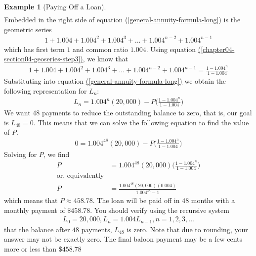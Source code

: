 \documentclass[10pt,]{book}
\theoremstyle{plain}
\theoremstyle{definition}
\theoremstyle{definition}
\newtheorem{example}[theorem]{Example}
\theoremstyle{definition}
\numberwithin{equation}{section}
\begin{document}
\begin{example}[Paying Off a Loan]
\begin{gather}
\end{gather}
\hypertarget{p-163}{}%
Embedded in the right side of equation \hyperref[general-annuity-formula-long]{(\ref{general-annuity-formula-long})} is the geometric series%
%
\begin{gather*}
1 + 1.004 + 1.004^2 + 1.004^3 + ... + 1.004^{n-2} + 1.004^{n-1}
\end{gather*}
\hypertarget{p-164}{}%
which has first term \(1\) and common ratio \(1.004\). Using equation \hyperref[chapter04-section04-geoseries-step3]{(\ref{chapter04-section04-geoseries-step3})}, we know that%
%
\begin{gather*}
1 + 1.004 + 1.004^2 + 1.004^3 + ... + 1.004^{n-2} + 1.004^{n-1} = \frac{1-1.004^n}{1-1.004}
\end{gather*}
\hypertarget{p-165}{}%
Substituting into equation \hyperref[general-annuity-formula-long]{(\ref{general-annuity-formula-long})} we obtain the following representation for  \(L_n\):%
%
\begin{gather}
L_n = 1.004^n (20,000) - P\bigg(\frac{1-1.004^n}{1-1.004}\bigg)\label{general-annuity-formula-condensed}
\end{gather}
\hypertarget{p-166}{}%
We want \(48\) payments to reduce the outstanding balance to zero, that is, our goal is  \(L_{48}=0\). This means that we can solve the following equation to find the value of \(P\).%
%
\begin{gather*}
0 = 1.004^{48}(20,000)-P\bigg(\frac{1-1.004^n}{1-1.004}\bigg)
\end{gather*}
\hypertarget{p-167}{}%
Solving for \(P\), we find%
%
\begin{align*}
P &= 1.004^{48}(20,000)\bigg(\frac{1-1.004^n}{1-1.004}\bigg)\\
\text{or, equivalently}\\
P&=\frac{1.004^{48}(20,000)(0.004)}{1.004^{48}-1}
\end{align*}
\hypertarget{p-168}{}%
which means that \(P \approx 458.78\). The loan will be paid off in \(48\) months with a monthly payment of \(\$458.78\). You should verify using the recursive system%
%
\begin{gather*}
L_0 = 20,000, L_n = 1.004L_{n-1}, n = 1, 2, 3, ...
\end{gather*}
\hypertarget{p-169}{}%
that the balance after \(48\) payments, \(L_{48}\) is zero. Note that due to rounding, your answer may not be exactly zero. The final baloon payment may be a few cents more or less than \(\$458.78\)%
\par
\hypertarget{p-170}{}%

\end{example}
\end{document}
